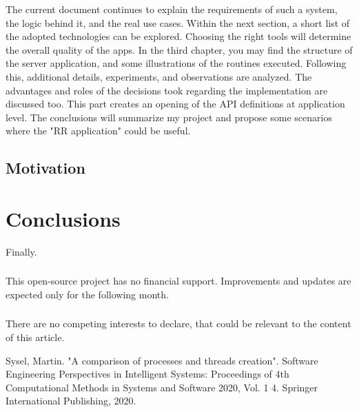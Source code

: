 \documentclass[runningheads]{llncs}
\begin{document}
The current document continues to explain the requirements of such a system, the logic behind it, and the real use cases. Within the next section, a short list of the adopted technologies can be explored. Choosing the right tools will determine the overall quality of the apps. In the third chapter, you may find the structure of the server application, and some illustrations of the routines executed. Following this, additional details, experiments, and observations are analyzed. The advantages and roles of the decisions took regarding the implementation are discussed too. This part creates an opening of the API definitions at application level. The conclusions will summarize my project and propose some scenarios where the "RR application" could be useful.

\subsection{Motivation}




\section{Conclusions}

Finally.

\begin{credits}
    \subsubsection{\ackname} This open-source project has no financial support. Improvements and updates are expected only for the following month.
    \subsubsection{\discintname}
    There are no competing interests to declare, that could be relevant to the content of this article.
    \end{credits}
    


\begin{thebibliography}{8}

 Sysel, Martin. "A comparison of processes and threads creation". Software Engineering Perspectives in Intelligent Systems: Proceedings of 4th Computational Methods in Systems and Software 2020, Vol. 1 4. Springer International Publishing, 2020. \\ 

\end{thebibliography}
\end{document}
